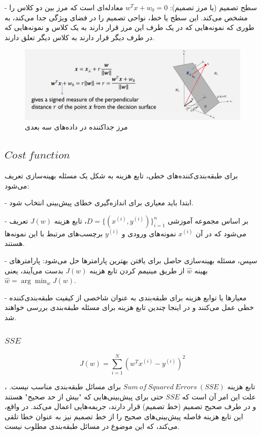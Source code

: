 \documentclass[12pt]{article}
\begin{document}
- سطح تصمیم (یا مرز تصمیم): \(w^Tx + w_0 = 0\) معادله‌ای است که مرز بین دو کلاس را مشخص می‌کند. این سطح یا خط، نواحی تصمیم را در فضای ویژگی جدا می‌کند، به طوری که نمونه‌هایی که در یک طرف این مرز قرار دارند به یک کلاس و نمونه‌هایی که در طرف دیگر قرار دارند به کلاس دیگر تعلق دارند.

\begin{figure}
    \centering
    \includegraphics[width=1\linewidth]{image2.png}
    \caption{مرز جداکننده در داده‌های سه بعدی}
    \label{fig:enter-label}
\label{fig:f1}
\end{figure}

 \subsection{
$Cost\:function$ }

برای طبقه‌بندی‌کننده‌های خطی، تابع هزینه به شکل یک مسئله بهینه‌سازی تعریف می‌شود:

- ابتدا باید معیاری برای اندازه‌گیری خطای پیش‌بینی انتخاب شود.

- بر اساس مجموعه آموزشی \( D = \{(x^{(i)}, y^{(i)})\}^n_{i=1} \)، تابع هزینه \( J(w) \) تعریف می‌شود که در آن \( x^{(i)} \) نمونه‌های ورودی و \( y^{(i)} \) برچسب‌های مرتبط با این نمونه‌ها هستند.

- سپس، مسئله بهینه‌سازی حاصل برای یافتن بهترین پارامترها حل می‌شود: پارامترهای بهینه \( \hat{w} \) از طریق مینیمم کردن تابع هزینه \( J(w) \) بدست می‌آیند، یعنی \( \hat{w} = \arg\min_w J(w) \).

- معیارها یا توابع هزینه برای طبقه‌بندی به عنوان شاخصی از کیفیت طبقه‌بندی‌کننده خطی عمل می‌کنند و در اینجا چندین تابع هزینه برای مسئله طبقه‌بندی بررسی خواهند شد.
\subsubsection{$SSE$}

\[ J(w) = \sum_{i=1}^{N} (w^T x^{(i)} - y^{(i)})^2 \]

، تابع هزینه $Sum\:of\:Squared\:Errors\:(SSE)$ برای مسائل طبقه‌بندی مناسب نیست. علت این امر آن است که $SSE$ حتی برای پیش‌بینی‌هایی که "بیش از حد صحیح" هستند و در طرف صحیح تصمیم (خط تصمیم) قرار دارند، جریمه‌هایی اعمال می‌کند. در واقع، این تابع هزینه فاصله پیش‌بینی‌های صحیح را از خط تصمیم نیز به عنوان خطا تلقی می‌کند، که این موضوع در مسائل طبقه‌بندی مطلوب نیست. 
\end{document}
